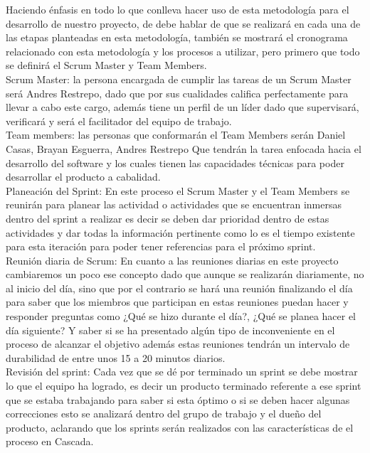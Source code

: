 Haciendo énfasis en todo lo que conlleva hacer uso de esta metodología para el desarrollo de nuestro proyecto, de debe hablar de que se realizará en cada una de las etapas planteadas en esta metodología, también se mostrará el cronograma relacionado con esta metodología y los procesos a utilizar, pero primero que todo se definirá el Scrum Master y Team Members.\\

Scrum Master: la persona encargada de cumplir las tareas de un Scrum Master será Andres Restrepo, dado que por sus cualidades califica perfectamente para llevar a cabo este cargo, además tiene un perfil de un líder dado que supervisará, verificará y será el facilitador del equipo de trabajo.\\

Team members: las personas que conformarán el Team Members serán Daniel Casas, Brayan Esguerra, Andres Restrepo Que tendrán la tarea enfocada hacia el desarrollo del software y los cuales tienen las capacidades técnicas para poder desarrollar el producto a cabalidad.\\

Planeación del Sprint: En este proceso el Scrum Master y el Team Members  se reunirán para planear las actividad o actividades que se encuentran inmersas dentro del sprint a realizar es decir se deben dar prioridad dentro de estas actividades y dar todas la información pertinente como lo es el tiempo existente para esta iteración para poder tener referencias para el próximo sprint.\\

Reunión diaria de Scrum: En cuanto a las reuniones diarias en este proyecto cambiaremos un poco ese concepto dado que aunque se realizarán diariamente, no al inicio del día, sino que por el contrario se hará una reunión finalizando el día para saber que los miembros que participan en estas reuniones puedan hacer y responder preguntas como ¿Qué se hizo durante el día?, ¿Qué se planea hacer el día siguiente? Y saber si se ha presentado algún tipo de inconveniente en el proceso de alcanzar el objetivo además estas reuniones tendrán un intervalo de durabilidad de entre unos 15 a 20 minutos diarios.\\

Revisión del sprint: Cada vez que se dé por terminado un sprint se debe mostrar lo que el equipo ha logrado, es decir un producto terminado referente a ese sprint que se estaba trabajando para saber si esta óptimo o si se deben hacer algunas correcciones esto se analizará dentro del grupo de trabajo y el dueño del producto, aclarando que los sprints serán realizados con las características de el proceso en Cascada.

